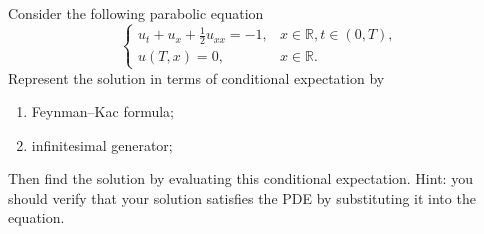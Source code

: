 \problem
\begin{question}
    Consider the following parabolic equation
    \begin{equation}
    \left\{
    \begin{array}{ll}
    u_t+u_x+\frac{1}{2}u_{xx}=-1,&x\in\mathbb R,t\in(0,T),\\
    u(T,x)=0,&x\in\mathbb R.
    \end{array}
    \right.
    \end{equation}
    Represent the solution in terms of conditional expectation by
    \begin{enumerate}[label=(\alph*)]
    \item Feynman--Kac formula;
    \item infinitesimal generator;
    \end{enumerate}
    Then find the solution by evaluating this conditional expectation.  Hint: you should verify that your solution satisfies the PDE by substituting it into the equation.
\end{question}
